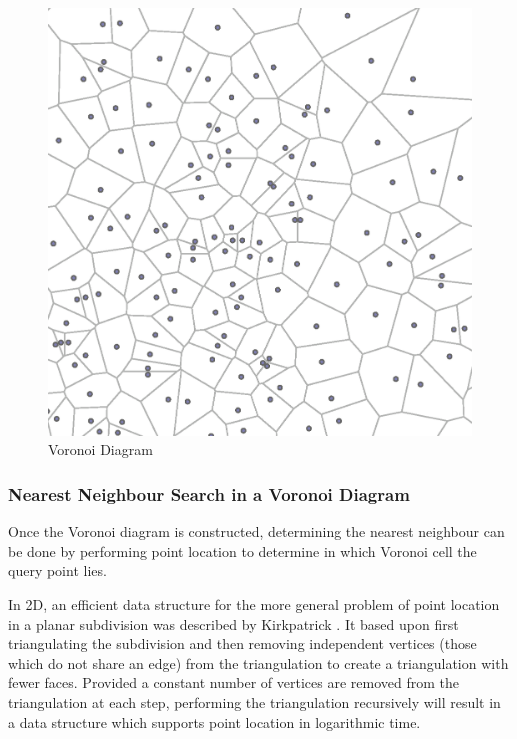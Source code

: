 \documentclass[mcs]{scsthesis}
\begin{document}
\begin{figure}
\begin{center}
\includegraphics[scale=0.5]{diagrams/voronoi.eps}
\caption{Voronoi Diagram}
\label{fig:voronoi_diagram}
\end{center}
\end{figure}

\subsubsection{Nearest Neighbour Search in a Voronoi Diagram}

Once the Voronoi diagram is constructed, determining the nearest neighbour can
be done by performing point location to determine in which Voronoi cell the
query point lies.

In 2D, an efficient data structure for the more general problem of point
location in a planar subdivision was described by Kirkpatrick
\cite{kirkpatrick}. It based upon first triangulating the subdivision and then
removing independent vertices (those which do not share an edge) from the
triangulation to create a triangulation with fewer faces. Provided a constant
number of vertices are removed from the triangulation at each step, performing
the triangulation recursively will result in a data structure which supports
point location in logarithmic time.
\end{document}
